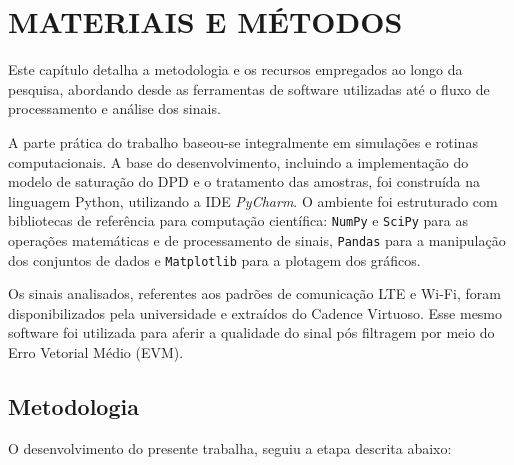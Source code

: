 \chapter{MATERIAIS E MÉTODOS}

Este capítulo detalha a metodologia e os recursos empregados ao longo da pesquisa, abordando desde as ferramentas de software utilizadas até o fluxo de processamento e análise dos sinais.

A parte prática do trabalho baseou-se integralmente em simulações e rotinas computacionais. A base do desenvolvimento, incluindo a implementação do modelo de saturação do DPD e o tratamento das amostras, foi construída na linguagem Python, utilizando a IDE \textit{PyCharm}. O ambiente foi estruturado com bibliotecas de referência para computação científica: \texttt{NumPy} e \texttt{SciPy} para as operações matemáticas e de processamento de sinais, \texttt{Pandas} para a manipulação dos conjuntos de dados e \texttt{Matplotlib} para a plotagem dos gráficos.

Os sinais analisados, referentes aos padrões de comunicação LTE e Wi-Fi, foram disponibilizados pela universidade e extraídos do Cadence Virtuoso. Esse mesmo  software foi utilizada para aferir a qualidade do sinal pós filtragem por meio do Erro Vetorial Médio (EVM).

\section{Metodologia}

O desenvolvimento do presente trabalha, seguiu a etapa descrita abaixo:

